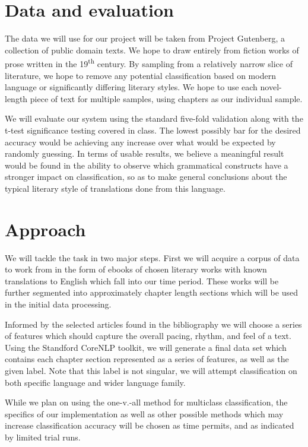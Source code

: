 \documentclass[11pt,letterpaper]{article}
\begin{document}
\section*{Data and evaluation}
The data we will use for our project will be taken from Project Gutenberg, a
collection of public domain texts. We hope to draw entirely from fiction works
of prose written in the 19\textsuperscript{th} century. By sampling from a
relatively narrow slice of literature, we hope to remove any potential
classification based on modern language or significantly differing literary
styles. We hope to use each novel-length piece of text for multiple samples,
using chapters as our individual sample.

We will evaluate our system using the standard five-fold validation along with
the t-test significance testing covered in class. The lowest possibly bar for
the desired accuracy would be achieving any increase over what would be expected
by randomly guessing. In terms of usable results, we believe a meaningful result
would be found in the ability to observe which grammatical constructs have a
stronger impact on classification, so as to make general conclusions about the
typical literary style of translations done from this language.

\section*{Approach} 
We will tackle the task in two major steps. First we will acquire a corpus of
data to work from in the form of ebooks of chosen literary works with known
translations to English which fall into our time period. These works will be
further segmented into approximately chapter length sections which will be used
in the initial data processing.

Informed by the selected articles found in the bibliography we will choose a
series of features which should capture the overall pacing, rhythm, and feel of
a text. Using the Standford CoreNLP toolkit, we will generate a final data set
which contains each chapter section represented as a series of features, as well
as the given label. Note that this label is not singular, we will attempt
classification on both specific language and wider language family.

While we plan on using the one-v.-all method for multiclass classification, the
specifics of our implementation as well as other possible methods which may
increase classification accuracy will be chosen as time permits, and as
indicated by limited trial runs.
\end{document}
